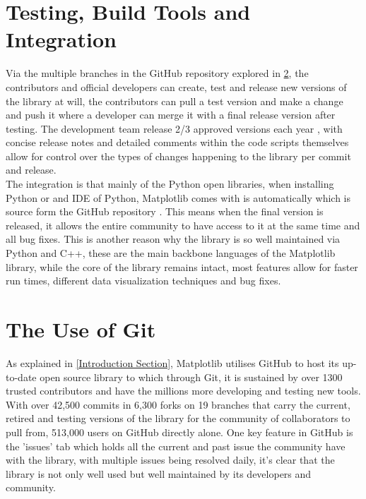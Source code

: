 \documentclass[12pt, a4paper]{article}
\begin{document}
\section{Testing, Build Tools and Integration}
\label{Testing}

Via the multiple branches in the GitHub repository explored in \cref{The Use of Git Section}, the contributors and official developers can create, test and release new versions of the library at will, the contributors can pull a test version and make a change and push it where a developer can merge it with a final release version after testing. The development team release 2/3 approved versions each year \cite{Release}, with concise release notes and detailed comments within the code scripts themselves allow for control over the types of changes happening to the library per commit and release. \\

The integration is that mainly of the Python open libraries, when installing Python or and IDE of Python, Matplotlib comes with is automatically which is source form the GitHub repository \cite{GitHub}. This means when the final version is released, it allows the entire community to have access to it at the same time and all bug fixes. This is another reason why the library is so well maintained via Python and C++, these are the main backbone languages of the Matplotlib library, while the core of the library remains intact, most features allow for faster run times, different data visualization techniques and bug fixes.

\section{The Use of Git}
\label{The Use of Git Section}

As explained in \cref{Introduction Section}, Matplotlib utilises GitHub to host its up-to-date open source library to which through Git, it is sustained by over 1300 trusted contributors and have the millions more developing and testing new tools. With over 42,500 commits in 6,300 forks on 19 branches that carry the current, retired and testing versions of the library for the community of collaborators to pull from, 513,000 users on GitHub directly alone. One key feature in GitHub is the 'issues' tab which holds all the current and past issue the community have with the library, with multiple issues being resolved daily, it's clear that the library is not only well used but well maintained by its developers and community. \\
\end{document}
